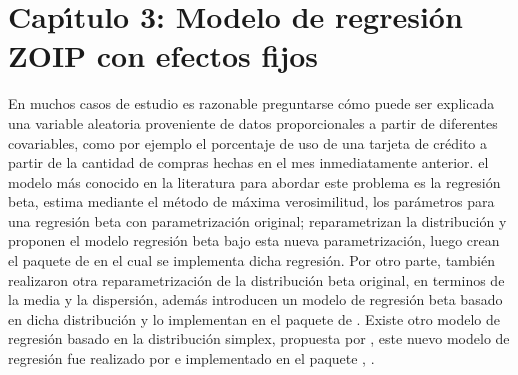 \chapter{Cap\'{\i}tulo 3: Modelo de regresi\'{o}n ZOIP con efectos fijos}\label{cap3}

En muchos casos de estudio es razonable preguntarse c\'{o}mo puede ser explicada una variable aleatoria proveniente de datos proporcionales a partir de diferentes covariables, como por ejemplo el porcentaje de uso de una tarjeta de cr\'{e}dito a partir de la cantidad de compras hechas en el mes inmediatamente anterior. el modelo m\'{a}s conocido en la literatura para abordar este problema es la regresi\'{o}n beta, \cite{Paolino1} estima mediante el m\'{e}todo de m\'{a}xima verosimilitud, los par\'{a}metros para una regresi\'{o}n beta con parametrizaci\'{o}n original; \cite{Ferrari2} reparametrizan la distribuci\'{o}n y proponen el modelo regresi\'{o}n beta bajo esta nueva parametrizaci\'{o}n, luego \cite{Zeileis1} crean el paquete  de  en el cual se implementa dicha regresi\'{o}n. Por otro parte, \cite{Stasinopoulos2} tambi\'{e}n realizaron otra reparametrizaci\'{o}n de la distribuci\'{o}n beta original, en terminos de la media y la dispersi\'{o}n, adem\'{a}s introducen un modelo de regresi\'{o}n beta basado en dicha distribuci\'{o}n y lo implementan en el paquete  de . Existe otro modelo de regresi\'{o}n basado en  la distribuci\'{o}n simplex, propuesta por \cite{Barndorff1}, este nuevo modelo de regresi\'{o}n fue realizado por \cite{Qiu1} e implementado en el paquete , \cite{Zhang1}.\\

